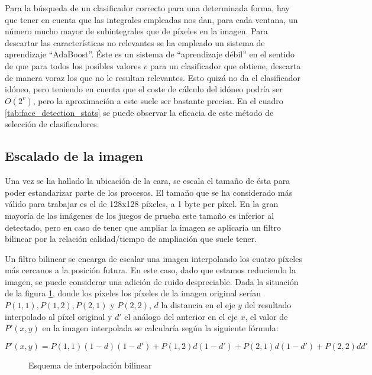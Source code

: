 Para la búsqueda de un clasificador correcto para una determinada forma, hay que tener en cuenta que las integrales empleadas nos dan, para cada ventana, un número mucho mayor de subintegrales que de píxeles en la imagen. Para descartar las características no relevantes se ha empleado un sistema de aprendizaje ``AdaBoost''. Éste es un sistema de ``aprendizaje débil'' en el sentido de que para todos los posibles valores $v$ para un clasificador que obtiene, descarta de manera voraz los que no le resultan relevantes. Esto quizá no da el clasificador idóneo, pero teniendo en cuenta que el coste de cálculo del idóneo podría ser $O(2^{v})$, pero la aproximación a este suele ser bastante precisa. En el cuadro \ref{tab:face_detection_stats} se puede observar la eficacia de este método de selección de clasificadores.

\subsection{Escalado de la imagen}
Una vez se ha hallado la ubicación de la cara, se escala el tamaño de ésta para poder estandarizar parte de los procesos. El tamaño que se ha considerado más válido para trabajar es el de 128x128 píxeles, a 1 byte per píxel. En la gran mayoría de las imágenes de los juegos de prueba este tamaño es inferior al detectado, pero en caso de tener que ampliar la imagen se aplicaría un filtro bilinear por la relación calidad/tiempo de ampliación que suele tener.

Un filtro bilinear se encarga de escalar una imagen interpolando los cuatro píxeles más cercanos a la posición futura\cite{bilinearInterpolation}. En este caso, dado que estamos reduciendo la imagen, se puede considerar una adición de ruido despreciable. Dada la situación de la figura \ref{fig:interp_bilinear}, donde los píxeles los píxeles de la imagen original serían $P(1,1), P(1,2), P(2,1)$ y $P(2,2)$, $d$ la distancia en el eje $y$ del resultado interpolado al píxel original y $d'$ el análogo del anterior en el eje $x$, el valor de $P'(x,y)$ en la imagen interpolada se calcularía según la siguiente fórmula:

\[ P'(x,y) = P(1,1) (1-d) (1-d')+ P(1,2) d (1-d') + P(2,1) d (1-d') + P(2,2) d d'
\]

\begin{figure}[h!]
        \centering
        
        \caption{Esquema de interpolación bilinear}
	\label{fig:interp_bilinear}
\end{figure}


